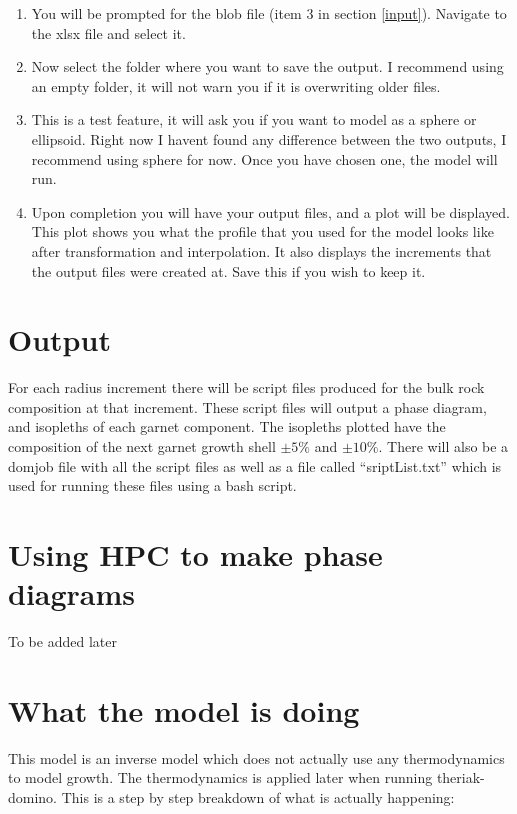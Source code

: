 \documentclass[12pt]{article}
\begin{document}
\begin{enumerate}
\begin{itemize}
\end{itemize}
\item You will be prompted for the blob file (item 3 in section \ref{input}). Navigate to the xlsx file and select it.
\item Now select the folder where you want to save the output. I recommend using an empty folder, it will not warn you if it is overwriting older files.
\item This is a test feature, it will ask you if you want to model as a sphere or ellipsoid. Right now I havent found any difference between the two outputs, I recommend using sphere for now. Once you have chosen one, the model will run.
\item Upon completion you will have your output files, and a plot will be displayed. This plot shows you what the profile that you used for the model looks like after transformation and interpolation. It also displays the increments that the output files were created at. Save this if you wish to keep it.
\end{enumerate}
\section{Output}
For each radius increment there will be script files produced for the bulk rock composition at that increment. These script files will output a phase diagram, and isopleths of each garnet component. The isopleths plotted have the composition of the next garnet growth shell $\pm 5\%$ and $\pm 10\%$. There will also be a domjob file with all the script files as well as a file called ``sriptList.txt'' which is used for running these files using a bash script.
\section{Using HPC to make phase diagrams}
To be added later
\section{What the model is doing}
This model is an inverse model which does not actually use any thermodynamics to model growth. The thermodynamics is applied later when running theriak-domino. This is a step by step breakdown of what is actually happening:
\end{document}
